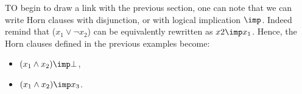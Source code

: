 \vspace{1.2em}

TO begin to draw a link with the previous section, one can note that we can 
write Horn clauses with disjunction, or with logical implication $\imp$. Indeed
remind that ($x_1 \lor \lnot x_2 $) can be equivalently rewritten as $x2 \imp 
x_1$. Hence, the Horn clauses defined in the previous examples become:
\begin{itemize}
	\item $(x_1 \land x_2) \imp \bot$,
	\item $(x_1 \land x_2) \imp x_3$.
\end{itemize}


\begin{definition}
	
\end{definition}

\begin{definition}
	
\end{definition}